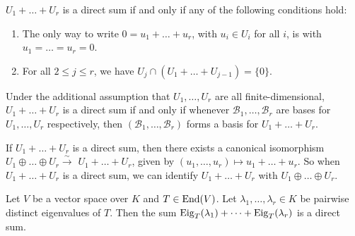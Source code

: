 \begin{exercise}\label{ex:direct_sum_conditions}
  $U_1 + \dots + U_r$ is a direct sum if and only if any of the following conditions hold:
  \begin{enumerate}
    \item The only way to write $0 = u_1 + \dots + u_r$, with $u_i \in U_i$ for all $i$, is with $u_1 = \dots = u_r = 0$.
    \item For all $2 \le j \le r$, we have $U_j \cap (U_1 + \dots + U_{j-1}) = \{0\}$.
  \end{enumerate}
  Under the additional assumption that $U_1, \dots, U_r$ are all finite-dimensional, $U_1 + \dots + U_r$ is a direct sum if and only if whenever $\mathcal{B}_1, \dots, \mathcal{B}_r$ are bases for $U_1, \dots, U_r$ respectively, then $(\mathcal{B}_1, \dots, \mathcal{B}_r)$ forms a basis for $U_1 + \dots + U_r$.
\end{exercise}

\begin{exercise}\label{ex:canonical_iso_direct_sum}
  If $U_1 + \dots + U_r$ is a direct sum, then there exists a canonical isomorphism $U_1 \oplus \dots \oplus U_r \xrightarrow{\sim} $ $U_1 + \dots + U_r$, given by $(u_1, \dots, u_r) \mapsto u_1 + \dots + u_r$. So when $U_1 + \dots + U_r$ is a direct sum, we can identify $U_1 + \dots + U_r$ with $U_1 \oplus \dots \oplus U_r$.
\end{exercise}

\begin{proposition}\label{prop:direct_sum_eigenspaces}
  Let $V$ be a vector space over $K$ and $T \in \operatorname{End}(V)$. Let $\lambda_1, \dots, \lambda_r \in K$ be pairwise distinct eigenvalues of $T$. Then the sum $\operatorname{Eig}_T(\lambda_1) + \dots + \operatorname{Eig}_T(\lambda_r)$ is a direct sum.
\end{proposition}

